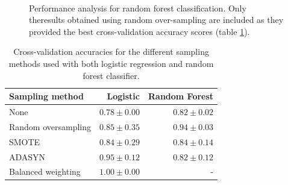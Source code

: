 \begin{figure}[H]
\begin{center}
     \\
\end{center}
\caption[caption]{Performance analysis for random forest classification. Only theresults obtained using random over-sampling are included as they provided the
best cross-validation accuracy scores (table \ref{tab:crossvals}).}
\label{fig:forest-performance}
\end{figure}

\begin{table}[h]
    \centering
    \caption{Cross-validation accuracies for the different sampling methods
                used with both logistic regression and random forest
                classifier.}
    \label{tab:crossvals}
    \begin{tabular}{l|r|r}
        Sampling method & Logistic & Random Forest \\
        \hline
        None & $0.78 \pm 0.00$ & $0.82 \pm 0.02$ \\
        Random oversampling & $0.85 \pm 0.35$ & $0.94 \pm 0.03$ \\
        SMOTE & $0.84 \pm 0.29$ & $0.84 \pm 0.14$ \\
        ADASYN & $0.95 \pm 0.12$ & $0.82 \pm 0.12$ \\
        Balanced weighting & $1.00 \pm 0.00$ & - \\
    \end{tabular}
\end{table}

